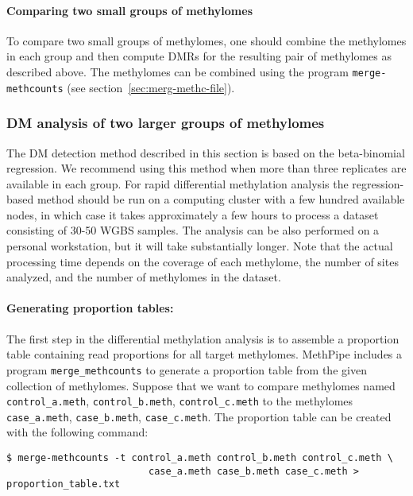 \documentclass[10pt]{article}
\newcommand{\prog}[1]{\texttt{#1}}
\begin{document}
\paragraph{Comparing two small groups of methylomes} To compare two small 
groups of methylomes, one should combine the methylomes in each group and 
then compute DMRs for the resulting pair of methylomes as described above. 
The methylomes can be combined using the program {\tt merge-methcounts} 
(see section~\ref{sec:merg-methc-file}).

\subsubsection{DM analysis of two larger groups of methylomes}

The DM detection method described in this section is based on the beta-binomial
regression. We recommend using this method when more than three replicates 
are available in each group. For rapid differential methylation analysis the 
regression-based method should be run on a computing cluster with a few
hundred available nodes, in which case it takes approximately a few hours to
process a dataset consisting of 30-50 WGBS samples. The analysis can be also
performed on a personal workstation, but it will take substantially longer. Note
that the actual processing time depends on the coverage of each methylome, the
number of sites analyzed, and the number of methylomes in the dataset.

\paragraph{Generating proportion tables:} The first step in the differential 
methylation analysis is to assemble a proportion table containing read 
proportions for all target methylomes. MethPipe includes a program 
\prog{merge\_methcounts} to generate a proportion table from the given collection of 
methylomes. Suppose that we want to compare methylomes named 
{\tt control\_a.meth}, {\tt control\_b.meth}, {\tt control\_c.meth}
to the methylomes {\tt case\_a.meth}, {\tt case\_b.meth}, 
{\tt case\_c.meth}. The proportion table can be created with the following 
command:

{\small{%
\begin{verbatim}
$ merge-methcounts -t control_a.meth control_b.meth control_c.meth \
                         case_a.meth case_b.meth case_c.meth > proportion_table.txt
\end{verbatim}%
}}
\end{document}
